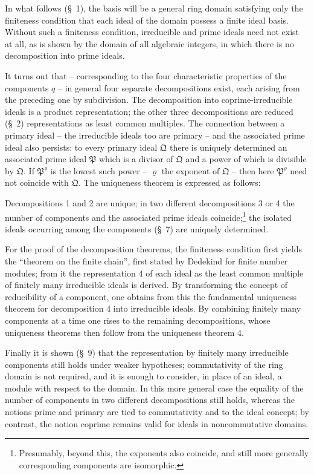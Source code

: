 \documentclass[11pt]{article}
\newcommand{\ideal}[1]{\mathfrak{#1}}
\begin{document}
In what follows (\S~1), the basis will be a general ring domain satisfying only the finiteness condition that each ideal of the domain possess a finite ideal basis. Without such a finiteness condition, irreducible and prime ideals need not exist at all, as is shown by the domain of all algebraic integers, in which there is no decomposition into prime ideals.

It turns out that -- corresponding to the four characteristic properties of the components $q$ -- in general four separate decompositions exist, each arising from the preceding one by subdivision. The decomposition into coprime-irreducible ideals is a product representation; the other three decompositions are reduced (\S~2) representations as least common multiples. The connection between a primary ideal -- the irreducible ideals too are primary -- and the associated prime ideal also persists: to every primary ideal $\ideal Q$ there is uniquely determined an associated prime ideal $\ideal P$ which is a divisor of $\ideal Q$ and a power of which is divisible by $\ideal Q$. If $\ideal P^\varrho$ is the lowest such power -- $\varrho$ the exponent of $\ideal Q$ -- then here $\ideal P^\varrho$ need not coincide with $\ideal Q$. The uniqueness theorem is expressed as follows:

Decompositions 1 and 2 are unique; in two different decompositions 3 or 4 the number of components and the associated prime ideals coincide;\footnote{Presumably, beyond this, the exponents also coincide, and still more generally corresponding components are isomorphic.} the isolated ideals occurring among the components (\S~7) are uniquely determined.

For the proof of the decomposition theorems, the finiteness condition first yields the ``theorem on the finite chain'', first stated by Dedekind for finite number modules; from it the representation 4 of each ideal as the least common multiple of finitely many irreducible ideals is derived. By transforming the concept of reducibility of a component, one obtains from this the fundamental uniqueness theorem for decomposition 4 into irreducible ideals. By combining finitely many components at a time one rises to the remaining decompositions, whose uniqueness theorems then follow from the uniqueness theorem 4.

Finally it is shown (\S~9) that the representation by finitely many irreducible components still holds under weaker hypotheses; commutativity of the ring domain is not required, and it is enough to consider, in place of an ideal, a module with respect to the domain. In this more general case the equality of the number of components in two different decompositions still holds, whereas the notions prime and primary are tied to commutativity and to the ideal concept; by contrast, the notion coprime remains valid for ideals in noncommutative domains.
\end{document}
